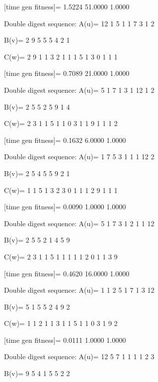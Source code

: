 [time gen fitness]=
    1.5224   51.0000    1.0000

Double digest sequence:
A(u)=
    12     1     5     1     1     7     3     1     2

B(v)=
     2     9     5     5     5     4     2     1

C(w)=
     2     9     1     1     3     2     1     1     1     5     1     3     0     1     1     1

[time gen fitness]=
    0.7089   21.0000    1.0000

Double digest sequence:
A(u)=
     5     1     7     1     3     1    12     1     2

B(v)=
     2     5     5     2     5     9     1     4

C(w)=
     2     3     1     1     5     1     1     0     3     1     1     9     1     1     1     2

[time gen fitness]=
    0.1632    6.0000    1.0000

Double digest sequence:
A(u)=
     1     7     5     3     1     1     1    12     2

B(v)=
     2     5     4     5     5     9     2     1

C(w)=
     1     1     5     1     3     2     3     0     1     1     1     2     9     1     1     1

[time gen fitness]=
    0.0090    1.0000    1.0000

Double digest sequence:
A(u)=
     5     1     7     3     1     2     1     1    12

B(v)=
     2     5     5     2     1     4     5     9

C(w)=
     2     3     1     1     5     1     1     1     1     1     2     0     1     1     3     9

[time gen fitness]=
    0.4620   16.0000    1.0000

Double digest sequence:
A(u)=
     1     1     2     5     1     7     1     3    12

B(v)=
     5     1     5     5     2     4     9     2

C(w)=
     1     1     2     1     1     3     1     1     5     1     1     0     3     1     9     2

[time gen fitness]=
    0.0111    1.0000    1.0000

Double digest sequence:
A(u)=
    12     5     7     1     1     1     1     2     3

B(v)=
     9     5     4     1     5     5     2     2

